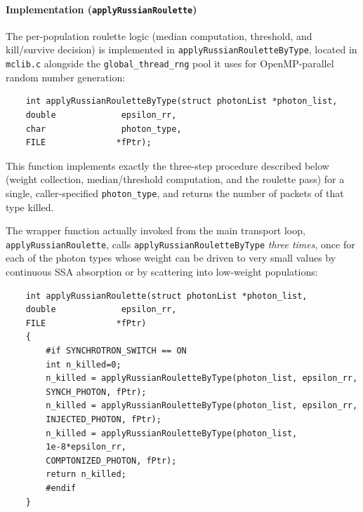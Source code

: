 \documentclass[12pt,a4paper]{article}
\newcommand{\code}[1]{\texttt{#1}}
\begin{document}
\paragraph{Implementation (\texttt{applyRussianRoulette})}
\label{sec:rr_impl}

The per-population roulette logic (median computation, threshold, and
kill/survive decision) is implemented in
\code{applyRussianRouletteByType}, located in \code{mclib.c} alongside
the \code{global\_thread\_rng} pool it uses for OpenMP-parallel random
number generation:

\begin{verbatim}
	int applyRussianRouletteByType(struct photonList *photon_list,
	double             epsilon_rr,
	char               photon_type,
	FILE              *fPtr);
\end{verbatim}

This function implements exactly the three-step procedure described
below (weight collection, median/threshold computation, and the
roulette pass) for a single, caller-specified \code{photon\_type}, and
returns the number of packets of that type killed.

The wrapper function actually invoked from the main transport loop,
\code{applyRussianRoulette}, calls
\code{applyRussianRouletteByType} \emph{three times}, once for each of
the photon types whose weight can be driven to very small values by
continuous SSA absorption or by scattering into low-weight populations:

\begin{verbatim}
	int applyRussianRoulette(struct photonList *photon_list,
	double             epsilon_rr,
	FILE              *fPtr)
	{
		#if SYNCHROTRON_SWITCH == ON
		int n_killed=0;
		n_killed = applyRussianRouletteByType(photon_list, epsilon_rr,
		SYNCH_PHOTON, fPtr);
		n_killed = applyRussianRouletteByType(photon_list, epsilon_rr,
		INJECTED_PHOTON, fPtr);
		n_killed = applyRussianRouletteByType(photon_list,
		1e-8*epsilon_rr,
		COMPTONIZED_PHOTON, fPtr);
		return n_killed;
		#endif
	}
\end{verbatim}
\end{document}
